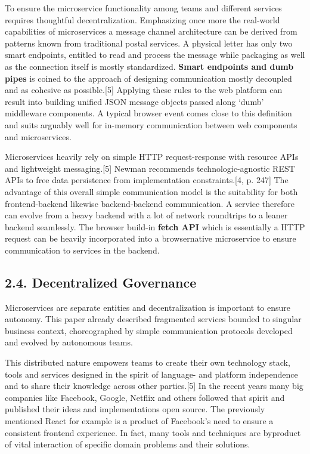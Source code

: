 \documentclass[]{article}
\begin{document}
To ensure the microservice functionality among teams and different
services requires thoughtful decentralization. Emphasizing once more the
real-world capabilities of microservices a message channel architecture
can be derived from patterns known from traditional postal services. A
physical letter has only two smart endpoints, entitled to read and
process the message while packaging as well as the connection itself is
mostly standardized. \textbf{Smart endpoints and dumb pipes} is coined
to the approach of designing communication mostly decoupled and as
cohesive as possible.{[}5{]} Applying these rules to the web platform
can result into building unified JSON message objects passed along
`dumb' middleware components. A typical browser event comes close to
this definition and suits arguably well for in-memory communication
between web components and microservices.

Microservices heavily rely on simple HTTP request-response with resource
APIs and lightweight messaging.{[}5{]} Newman recommends
technologic-agnostic REST APIs to free data persistence from
implementation constraints.{[}4, p. 247{]} The advantage of this overall
simple communication model is the suitability for both frontend-backend
likewise backend-backend communication. A service therefore can evolve
from a heavy backend with a lot of network roundtrips to a leaner
backend seamlessly. The browser build-in \textbf{fetch API} which is
essentially a HTTP request can be heavily incorporated into a
browsernative microservice to ensure communication to services in the
backend.

\subsection{2.4. Decentralized
Governance}\label{decentralized-governance}

Microservices are separate entities and decentralization is important to
ensure autonomy. This paper already described fragmented services
bounded to singular business context, choreographed by simple
communication protocols developed and evolved by autonomous teams.

This distributed nature empowers teams to create their own technology
stack, tools and services designed in the spirit of language- and
platform independence and to share their knowledge across other
parties.{[}5{]} In the recent years many big companies like Facebook,
Google, Netflix and others followed that spirit and published their
ideas and implementations open source. The previously mentioned React
for example is a product of Facebook's need to ensure a consistent
frontend experience. In fact, many tools and techniques are byproduct of
vital interaction of specific domain problems and their solutions.
\end{document}

